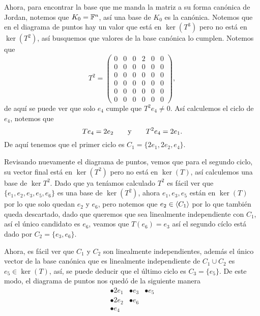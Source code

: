 \begin{example}
  Ahora, para encontrar la base que me manda la matriz a su forma canónica de Jordan, notemos que $K_0 = \mathbb{F}^n$, así una base de $K_0$ es la canónica. Notemos que en el diagrama de puntos hay un valor que está en $\ker(T^3)$ pero no está en $\ker(T^2)$, así busquemos que valores de la base canónica lo cumplen. Notemos que
    \[
      T^2 = \begin{pmatrix} 0 & 0 & 0 & 2 & 0 & 0 \\ 0 & 0 & 0 & 0 & 0 & 0 \\ 0 & 0 & 0 & 0 & 0 & 0 \\ 0 & 0 & 0 & 0 & 0 &0 \\ 0 & 0 & 0 & 0 & 0 & 0 \\ 0 & 0 & 0 & 0 & 0 & 0 \end{pmatrix},
    \]
  de aquí se puede ver que solo $e_4$ cumple que $T^2e_4 \neq 0$. Así calculemos el ciclo de $e_4$, notemos que
  \[
    Te_4 = 2e_2 \qquad\text{y}\qquad T^2e_4 = 2e_1.
  \]
  De aquí tenemos que el primer ciclo es $C_1 = \{2e_1, 2e_2, e_4\}$. 

  Revisando nuevamente el diagrama de puntos, vemos que para el segundo ciclo, su vector final está en $\ker(T^2)$ pero no está en $\ker(T)$, así calculemos una base de $\ker T^2$. Dado que ya teníamos calculado $T^2$  es fácil ver que  $ \{ e_1, e_2, e_3, e_5, e_6 \} $ es una base de $\ker(T^2)$, ahora $e_1, e_3, e_5$ están en $\ker(T)$ por lo que solo quedan $e_2$ y $e_6$, pero notemos que $e_2 \in \langle C_1\rangle$ por lo que también queda descartado, dado que queremos que sea linealmente independiente con $C_1$, así el único candidato es $e_6$, veamos que $T(e_6) = e_3$ así el segundo cíclo está dado por $C_2 = \{e_3, e_6\}$.

  Ahora, es fácil ver que $C_1$ y $C_2$ son linealmente independientes, además el único vector de la base canónica que es linealmente independiente de  $C_1 \cup C_2$ es $e_5 \in \ker(T)$, así, se puede deducir que el último ciclo es $C_3 = \{e_5\}$. De este modo, el diagrama de puntos nos quedó de la siguiente manera 
  \[\begin{array}{lll}
    \bullet 2e_1 & \bullet e_3 & \bullet e_5 \\
    \bullet 2e_2 & \bullet e_6 \\
    \bullet e_4
  \end{array}\]


\end{example}
